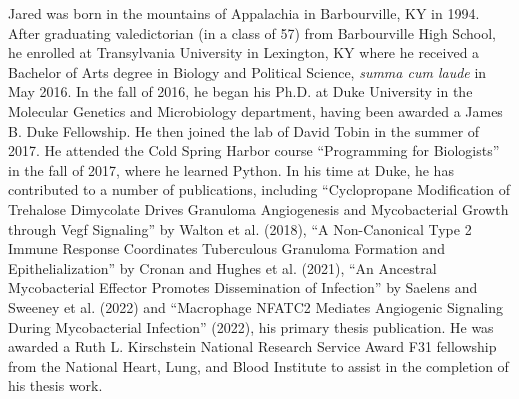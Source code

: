 \documentclass[PhD]{dukethesis2006}
\begin{document}
\begin{doublespace}

Jared was born in the mountains of Appalachia in Barbourville, KY in 1994. After graduating valedictorian (in a class of 57) from Barbourville High School, he enrolled at Transylvania University in Lexington, KY where he received a Bachelor of Arts degree in Biology and Political Science, \textit{summa cum laude} in May 2016. In the fall of 2016, he began his Ph.D. at Duke University in the Molecular Genetics and Microbiology department, having been awarded a James B. Duke Fellowship. He then joined the lab of David Tobin in the summer of 2017. He attended the Cold Spring Harbor course ``Programming for Biologists'' in the fall of 2017, where he learned Python. In his time at Duke, he has contributed to a number of publications, including ``Cyclopropane Modification of Trehalose Dimycolate Drives Granuloma Angiogenesis and Mycobacterial Growth through Vegf Signaling'' by Walton et al. (2018), ``A Non-Canonical Type 2 Immune Response Coordinates Tuberculous Granuloma Formation and Epithelialization'' by Cronan and Hughes et al. (2021), ``An Ancestral Mycobacterial Effector Promotes Dissemination of Infection'' by Saelens and Sweeney et al. (2022) and ``Macrophage NFATC2 Mediates Angiogenic Signaling During Mycobacterial Infection'' (2022), his primary thesis publication. He was awarded a Ruth L. Kirschstein National Research Service Award F31 fellowship from the National Heart, Lung, and Blood Institute to assist in the completion of his thesis work.

\end{doublespace}
\end{document}
